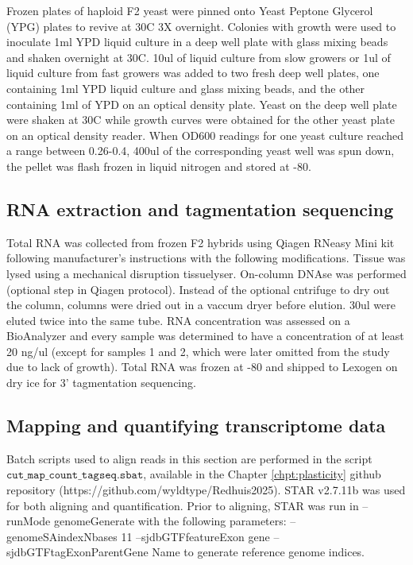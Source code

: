Frozen plates of haploid F2 yeast were pinned onto Yeast Peptone Glycerol (YPG) plates to revive at 30C 3X overnight. Colonies with growth were used to inoculate 1ml YPD liquid culture in a deep well plate with glass mixing beads and shaken overnight at 30C. 10ul of liquid culture from slow growers or 1ul of liquid culture from fast growers was added to two fresh deep well plates, one containing 1ml YPD liquid culture and glass mixing beads, and the other containing 1ml of YPD on an optical density plate. Yeast on the deep well plate were shaken at 30C while growth curves were obtained for the other yeast plate on an optical density reader. When OD600 readings for one yeast culture reached a range between 0.26-0.4, 400ul of the corresponding yeast well was spun down, the pellet was flash frozen in liquid nitrogen and stored at -80.

\subsection{RNA extraction and tagmentation sequencing}

Total RNA was collected from frozen F2 hybrids using Qiagen RNeasy Mini kit following manufacturer's instructions with the following modifications. Tissue was lysed using a mechanical disruption tissuelyser. On-column DNAse was performed (optional step in Qiagen protocol). Instead of the optional cntrifuge to dry out the column, columns were dried out in a vaccum dryer before elution. 30ul were eluted twice into the same tube. RNA concentration was assessed on a BioAnalyzer and every sample was determined to have a concentration of at least 20 ng/ul (except for samples 1 and 2, which were later omitted from the study due to lack of growth). Total RNA was frozen at -80 and shipped to Lexogen on dry ice for 3' tagmentation sequencing.

\subsection{Mapping and quantifying transcriptome data}

Batch scripts used to align reads in this section are performed in the script $\texttt{cut\_map\_count\_tagseq.sbat}$, available in the Chapter \ref{chpt:plasticity} github repository (https://github.com/wyldtype/Redhuis2025). STAR v2.7.11b was used for both aligning and quantification. Prior to aligning, STAR was run in --runMode genomeGenerate with the following parameters: --genomeSAindexNbases 11 --sjdbGTFfeatureExon gene --sjdbGTFtagExonParentGene Name to generate reference genome indices.

